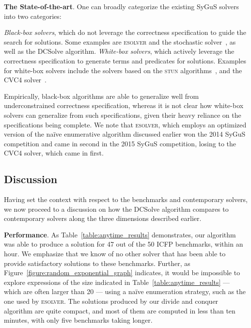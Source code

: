 \documentclass{llncs}
\newcommand{\sygus}{{\sffamily\fontsize{8.5}{10}\selectfont
    SyGuS}\xspace}
\newcommand{\dcsolve}{{\sffamily\fontsize{8.5}{10}\selectfont
    DCSolve}\xspace}
\renewcommand{\paragraph}[1]{\par\noindent\textbf{#1}.}
\newcommand{\esolver}{\textsc{esolver}\xspace}
\begin{document}
\paragraph{The State-of-the-art}
One can broadly categorize the existing \sygus solvers into two
categories:\begin{inparaenum}[(a)]
\item
\emph{Black-box solvers}, which do not leverage the correctness
specification to guide the search for solutions. Some examples are
\esolver and the stochastic solver~\cite{udupa-sygus}, as well as the
\dcsolve algorithm.
\emph{White-box solvers}, which actively leverage the correctness
specification to generate terms and predicates for solutions. Examples
for white-box solvers include the solvers based on the \textsc{stun}
algorithms~\cite{alur-15}, and the CVC4 solver~\cite{reynolds-15}.
\end{inparaenum}
Empirically, black-box algorithms are able to generalize well from
underconstrained correctness specification, whereas it is not clear
how white-box solvers can generalize from such specifications, given
their heavy reliance on the specifications being complete.
We note that \esolver, which employs an optimized
version of the na\"ive enumerative algorithm discussed earlier won the
2014 \sygus competition and came in second in the 2015 \sygus
competition, losing to the CVC4 solver, which came in first.

\subsection{Discussion}
Having set the context with respect to the benchmarks and contemporary
solvers, we now proceed to a discussion on how the
\dcsolve algorithm compares to contemporary solvers along the three
dimensions described earlier.

\paragraph{Performance}
As Table~\ref{table:anytime_results} demonstrates, our algorithm was
able to produce a solution for 47 out of the 50 ICFP benchmarks,
within an hour. We emphasize that we know of no other solver that has
been able to provide satisfactory solutions to these
benchmarks. Further, as Figure~\ref{figure:random_exponential_graph}
indicates, it would be impossible to explore expressions of the size
indicated in Table~\ref{table:anytime_results} --- which are often
larger than 20 --- using a na\"ive enumeration strategy, such as the
one used by \esolver.  The solutions produced by our divide and
conquer algorithm are quite compact, and most of them are computed in
less than ten minutes, with only five benchmarks taking longer.
\end{document}
